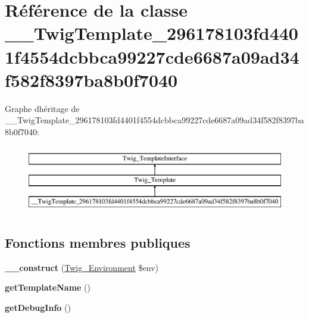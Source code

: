 \hypertarget{class_____twig_template__296178103fd4401f4554dcbbca99227cde6687a09ad34f582f8397ba8b0f7040}{}\section{Référence de la classe \+\_\+\+\_\+\+Twig\+Template\+\_\+296178103fd4401f4554dcbbca99227cde6687a09ad34f582f8397ba8b0f7040}
\label{class_____twig_template__296178103fd4401f4554dcbbca99227cde6687a09ad34f582f8397ba8b0f7040}
Graphe d\textquotesingle{}héritage de \+\_\+\+\_\+\+Twig\+Template\+\_\+296178103fd4401f4554dcbbca99227cde6687a09ad34f582f8397ba8b0f7040\+:\begin{figure}[H]
\begin{center}
\leavevmode
\includegraphics[height=3.000000cm]{class_____twig_template__296178103fd4401f4554dcbbca99227cde6687a09ad34f582f8397ba8b0f7040}
\end{center}
\end{figure}
\subsection*{Fonctions membres publiques}
\begin{DoxyCompactItemize}
\item 
{\bfseries \+\_\+\+\_\+construct} (\hyperlink{class_twig___environment}{Twig\+\_\+\+Environment} \$env)\hypertarget{class_____twig_template__296178103fd4401f4554dcbbca99227cde6687a09ad34f582f8397ba8b0f7040_a4f8326243132c1450a81e0a817aa1be7}{}\label{class_____twig_template__296178103fd4401f4554dcbbca99227cde6687a09ad34f582f8397ba8b0f7040_a4f8326243132c1450a81e0a817aa1be7}

\item 
{\bfseries get\+Template\+Name} ()\hypertarget{class_____twig_template__296178103fd4401f4554dcbbca99227cde6687a09ad34f582f8397ba8b0f7040_a621a3ccd148ed8b9e937da6959c98f39}{}\label{class_____twig_template__296178103fd4401f4554dcbbca99227cde6687a09ad34f582f8397ba8b0f7040_a621a3ccd148ed8b9e937da6959c98f39}

\item 
{\bfseries get\+Debug\+Info} ()\hypertarget{class_____twig_template__296178103fd4401f4554dcbbca99227cde6687a09ad34f582f8397ba8b0f7040_abd0ecb0136f4228db2bd963bfc1e20d7}{}\label{class_____twig_template__296178103fd4401f4554dcbbca99227cde6687a09ad34f582f8397ba8b0f7040_abd0ecb0136f4228db2bd963bfc1e20d7}

\end{DoxyCompactItemize}
